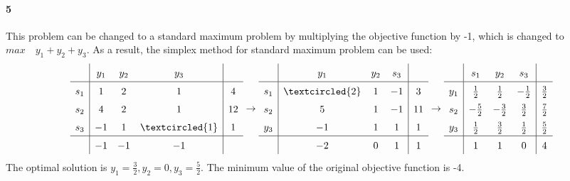 \documentclass[22pt]{article}
\begin{document}
	\paragraph{5} This problem can be changed to a standard maximum problem by multiplying the objective function by -1, which is changed to $max \quad y_1+y_2+y_3$. As a result, the simplex method for standard maximum problem can be used:
		\begin{equation}
		\renewcommand\arraystretch{1.5}
			\begin{matrix}
			\begin{array}{c|ccc|c}
			   & y_1 & y_2 & y_3 &  \\ \hline
			  s_1 & 1 & 2 & 1 & 4 \\ 
			  s_2 & 4 & 2 & 1 & 12 \\
			  s_3 & -1 & 1 & \textcircled{1} & 1 \\ \hline
			  & -1 & -1 & -1 & \\ 
			\end{array}
			\end{matrix}
			 \rightarrow 
			\begin{matrix}
			\begin{array}{c|ccc|c}
			  & y_1 & y_2 & s_3 &  \\ \hline
			  s_1 & \textcircled{2} & 1 & -1 & 3 \\ 
			  s_2 & 5 & 1 & -1 & 11 \\
			  y_3 & -1 & 1 & 1 & 1 \\ \hline
			  & -2 & 0 & 1 & 1 \\
			\end{array}
			\end{matrix}
			\rightarrow 
			\begin{matrix}
			\begin{array}{c|ccc|c}
			  & s_1 & y_2 & s_3 &  \\ \hline
			  y_1 & \frac{1}{2} & \frac{1}{2} & -\frac{1}{2} & \frac{3}{2} \\ 
			  s_2 & -\frac{5}{2} & -\frac{3}{2} & \frac{3}{2} & \frac{7}{2} \\
			  y_3 & \frac{1}{2} & \frac{3}{2} & \frac{1}{2} & \frac{5}{2} \\ \hline
			  & 1 & 1 & 0 & 4 \\
			\end{array}
			\end{matrix}
		\end{equation}
		The optimal solution is $y_1 = \frac{3}{2}, y_2 = 0, y_3= \frac{5}{2}$. The minimum value of the original objective function is -4.
\end{document}
